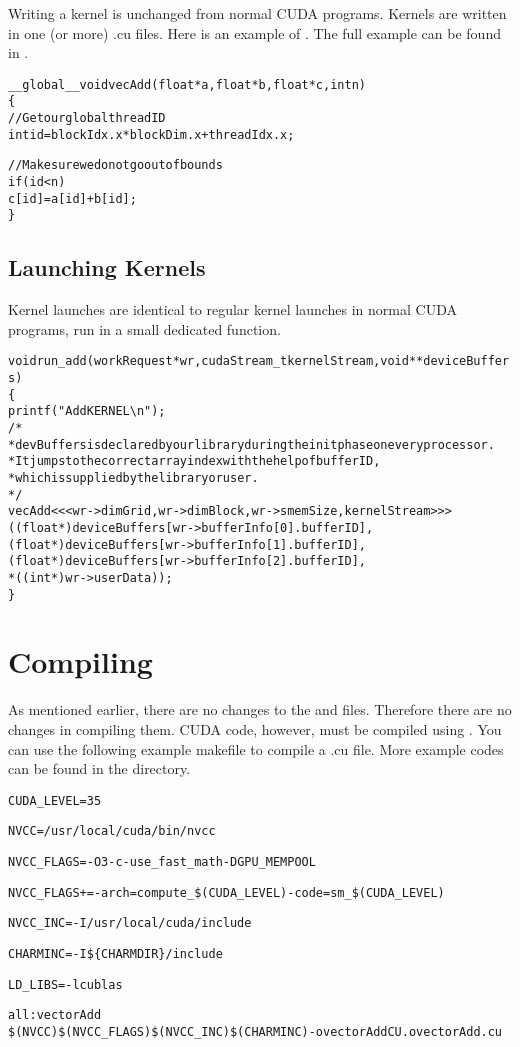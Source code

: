 Writing a kernel is unchanged from normal CUDA programs.
Kernels are written in one (or more) .cu files.
Here is an example of .
The full example can be found in .

\begin{alltt}
__global__ void vecAdd(float *a, float *b, float *c, int n)
\{
    // Get our global thread ID
    int id = blockIdx.x * blockDim.x + threadIdx.x;

    // Make sure we do not go out of bounds
    if (id < n)
        c[id] = a[id] + b[id];
\}
\end{alltt}

\subsection{Launching Kernels}

Kernel launches are identical to regular kernel launches in normal CUDA
programs, run in a small dedicated function.

\begin{alltt}
void run_add(workRequest *wr, cudaStream_t kernelStream, void **deviceBuffers)
\{
    printf("Add KERNEL \textbackslash{n}");
/*
 *  devBuffers is declared by our library during the init phase on every processor.
 *  It jumps to the correct array index with the help of bufferID,
 *  which is supplied by the library or user.
 */
    vecAdd<<< wr->dimGrid, wr->dimBlock, wr->smemSize, kernelStream>>>
        ((float *) deviceBuffers[wr->bufferInfo[0].bufferID],
         (float *) deviceBuffers[wr->bufferInfo[1].bufferID],
         (float *) deviceBuffers[wr->bufferInfo[2].bufferID],
         *((int *) wr->userData));
\}
\end{alltt}

\section{Compiling}

As mentioned earlier, there are no changes to the  and 
files. Therefore there are no changes in compiling them.
CUDA code, however, must be compiled using .
You can use the following example makefile to compile a .cu file.
More example codes can be found in the  directory.

\begin{alltt}
CUDA_LEVEL=35

NVCC = /usr/local/cuda/bin/nvcc

NVCC_FLAGS = -O3 -c -use_fast_math -DGPU_MEMPOOL

NVCC_FLAGS += -arch=compute_\$(CUDA_LEVEL) -code=sm_\$(CUDA_LEVEL)

NVCC_INC = -I/usr/local/cuda/include

CHARMINC = -I\$\{CHARMDIR\}/include

LD_LIBS= -lcublas

all: vectorAdd
\qquad\$(NVCC) \$(NVCC_FLAGS) \$(NVCC_INC) \$(CHARMINC) -o vectorAddCU.o vectorAdd.cu
\end{alltt}

